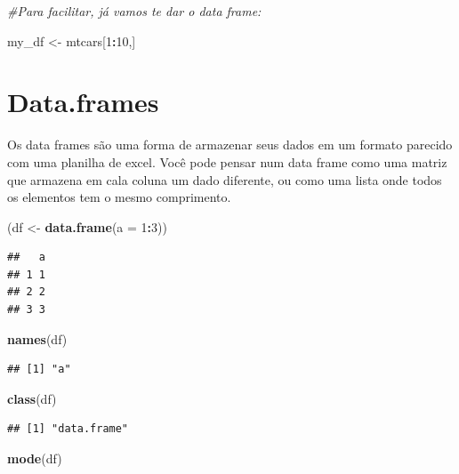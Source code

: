 \documentclass[]{book}
\newenvironment{Shaded}{\begin{snugshade}}{\end{snugshade}}
\newcommand{\KeywordTok}[1]{\textcolor[rgb]{0.13,0.29,0.53}{\textbf{#1}}}
\newcommand{\DataTypeTok}[1]{\textcolor[rgb]{0.13,0.29,0.53}{#1}}
\newcommand{\DecValTok}[1]{\textcolor[rgb]{0.00,0.00,0.81}{#1}}
\newcommand{\StringTok}[1]{\textcolor[rgb]{0.31,0.60,0.02}{#1}}
\newcommand{\CommentTok}[1]{\textcolor[rgb]{0.56,0.35,0.01}{\textit{#1}}}
\newcommand{\OperatorTok}[1]{\textcolor[rgb]{0.81,0.36,0.00}{\textbf{#1}}}
\newcommand{\NormalTok}[1]{#1}
\theoremstyle{definition}
\theoremstyle{definition}
\theoremstyle{definition}
\theoremstyle{remark}
\begin{document}
\begin{Shaded}
\begin{Highlighting}[]
\CommentTok{#Para facilitar, já vamos te dar o data frame:}

\NormalTok{my_df <-}\StringTok{ }\NormalTok{mtcars[}\DecValTok{1}\OperatorTok{:}\DecValTok{10}\NormalTok{,]}
\end{Highlighting}
\end{Shaded}

\section{Data.frames}\label{data.frames}

Os data frames são uma forma de armazenar seus dados em um formato
parecido com uma planilha de excel. Você pode pensar num data frame como
uma matriz que armazena em cala coluna um dado diferente, ou como uma
lista onde todos os elementos tem o mesmo comprimento.

\begin{Shaded}
\begin{Highlighting}[]
\NormalTok{(df <-}\StringTok{ }\KeywordTok{data.frame}\NormalTok{(}\DataTypeTok{a =} \DecValTok{1}\OperatorTok{:}\DecValTok{3}\NormalTok{))}
\end{Highlighting}
\end{Shaded}

\begin{verbatim}
##   a
## 1 1
## 2 2
## 3 3
\end{verbatim}

\begin{Shaded}
\begin{Highlighting}[]
\KeywordTok{names}\NormalTok{(df)}
\end{Highlighting}
\end{Shaded}

\begin{verbatim}
## [1] "a"
\end{verbatim}

\begin{Shaded}
\begin{Highlighting}[]
\KeywordTok{class}\NormalTok{(df)}
\end{Highlighting}
\end{Shaded}

\begin{verbatim}
## [1] "data.frame"
\end{verbatim}

\begin{Shaded}
\begin{Highlighting}[]
\KeywordTok{mode}\NormalTok{(df)}
\end{Highlighting}
\end{Shaded}
\end{document}
